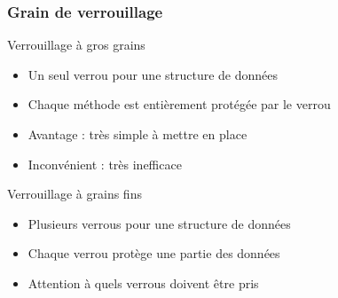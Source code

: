 
\begin{frame}
  \frametitle{Grain de verrouillage}

\vfill
\begin{block}{Verrouillage à gros grains}
    \begin{itemize}
    \item Un seul verrou pour une structure de données
    \item Chaque méthode est entièrement protégée par le verrou
    \item Avantage : très simple à mettre en place
    \item Inconvénient : très inefficace
    \end{itemize}
  \end{block}

\vfill
  \begin{block}{Verrouillage à grains fins}
    \begin{itemize}
    \item Plusieurs verrous pour une structure de données
    \item Chaque verrou protège une partie des données
    \item Attention à quels verrous doivent être pris
    \end{itemize}
  \end{block}
\vfill

\end{frame}


